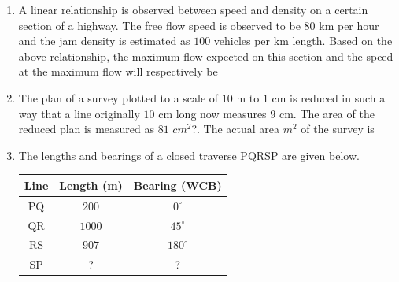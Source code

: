 \documentclass[journal]{IEEEtran}
\begin{document}
\begin{enumerate}
\item A linear relationship is observed between speed and density on a certain section of a highway. The free flow speed is observed to be $80$ km per hour and the jam density is estimated as $100$ vehicles per km length. Based on the above relationship, the maximum flow expected on this section and the speed at the maximum flow will respectively be \hfill {}
\begin{enumerate}
\end{enumerate}

\item The plan of a survey plotted to a scale of $10$ m to $1$ cm is reduced in such a way that a line originally $10$ cm long now measures $9$ cm. The area of the reduced plan is measured as $81$ $cm^{2}$?. The actual area $m^{2}$ of the survey is \hfill {}
\begin{enumerate}
\end{enumerate}

\item The lengths and bearings of a closed traverse PQRSP are given below.

\vspace{0.3cm}

\begin{tabular}{|c|c|c|}
\hline
Line & Length (m) & Bearing (WCB) \\
\hline
PQ & $200$ & $0^\circ$ \\
QR & $1000$ & $45^\circ$ \\
RS & $907$ & $180^\circ$ \\
SP & ? & ? \\
\hline
\end{tabular}


\end{enumerate}
\end{document}

